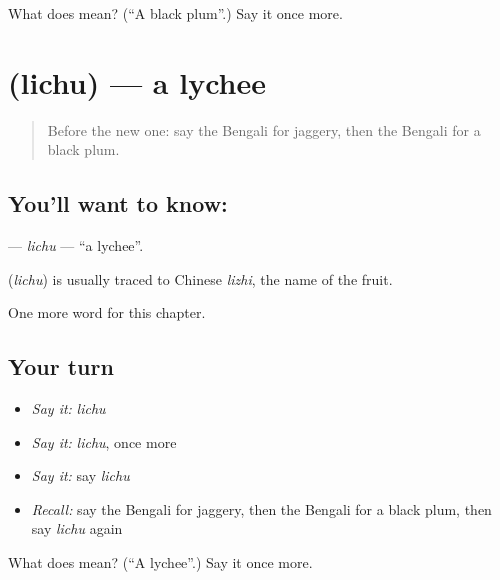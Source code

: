 \begin{tcolorbox}[breakable,colback=teal!4,colframe=teal!35!black,title={Before you move on}]
What does  mean? (\textquotedblleft{}A black plum\textquotedblright{}.) Say it once more.
\end{tcolorbox}
\section[\texorpdfstring{\bn{লিচু} (lichu)}{লিচু (lichu)}]{ (lichu) — a lychee}

\label{lesson:BN-C173-lichu}



\begin{quote}
Before the new one: say the Bengali for jaggery, then the Bengali for a black plum.
\end{quote}

\subsection*{You'll want to know: }
\textbf{} — \emph{lichu} — \textquotedblleft{}a lychee\textquotedblright{}.

\begin{cousinweb}
\textbf{} (\emph{lichu}) is usually traced to Chinese \emph{lizhi}, the name of the fruit.
\end{cousinweb}

\begin{grammarlens}[title={What you've built}]
One more word for this chapter.
\end{grammarlens}

\subsection*{Your turn}
\begin{itemize}
\raggedright
  \item \emph{Say it:} \emph{lichu}
  \item \emph{Say it:} \emph{lichu}, once more
  \item \emph{Say it:} say \emph{lichu}
  \item \emph{Recall:} say the Bengali for jaggery, then the Bengali for a black plum, then say \emph{lichu} again
\end{itemize}

\begin{tcolorbox}[breakable,colback=teal!4,colframe=teal!35!black,title={Before you move on}]
What does  mean? (\textquotedblleft{}A lychee\textquotedblright{}.) Say it once more.
\end{tcolorbox}
